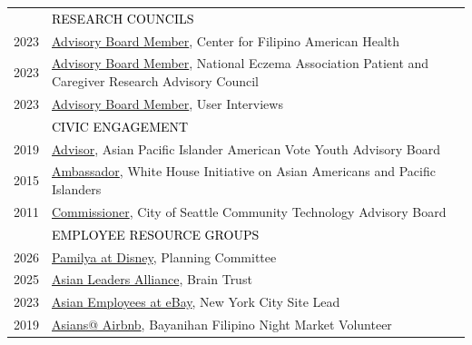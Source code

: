 \documentclass[12pt]{article}
\begin{document}
{\begin{longtable}{R{0.75in}p{5.0in}}
& \large \textcolor{black}{\uppercase{Research Councils}}\\
\footnotesize{2023} & \href{https://youtu.be/z_kgBHkfCiE}{Advisory Board Member}, Center for Filipino American Health\\

\footnotesize{2023} & \href{https://nationaleczema.org/about-nea/patient-caregiver-research-advisory-council/}{Advisory Board Member}, National Eczema Association Patient and Caregiver Research Advisory Council\\

\footnotesize{2023} & \href{https://www.userinterviews.com/}{Advisory Board Member}, User Interviews \medskip \\

& \large \textcolor{black}{\uppercase{Civic Engagement}}\\ 

\footnotesize{2019} & \href{https://apiavote.org/initiatives/youth-and-ambassadors/}{Advisor}, Asian Pacific Islander American Vote Youth Advisory Board\\

\footnotesize{2015} & \href{https://obamawhitehouse.archives.gov/blog/2015/09/04/white-house-initiative-aapis-selects-23-young-leaders-serve-2015-2016-e3-ambassadors}{Ambassador}, White House Initiative on Asian Americans and Pacific Islanders\\

\footnotesize{2011} & \href{https://web.archive.org/web/20150911093548/https://ischool.uw.edu/alumni/impact-stories/informatics-grad-and-husky-promise-student-aims-deliver-it-resources}{Commissioner}, City of Seattle Community Technology Advisory Board \medskip \\

& \large \textcolor{black}{\uppercase{Employee Resource Groups}}\\

\footnotesize{2026} & 
\href{https://inclusion.twdc.com/}{{Pamilya at Disney}}, Planning Committee\\ 

\footnotesize{2025} & 
\href{https://www.asianleadersalliance.com/}{{Asian Leaders Alliance}}, Brain Trust\\ 

\footnotesize{2023} & 
\href{https://www.tiktok.com/@ebaystories/video/7334050647136013614}{{Asian Employees at eBay}}, New York City Site Lead\\

\footnotesize{2019} & 
\href{https://web.archive.org/web/20200221070731/https://www.airbnb.com/diversity/belonging}{{Asians@ Airbnb}}, Bayanihan Filipino Night Market Volunteer \medskip \\


\end{longtable}}
\end{document}
